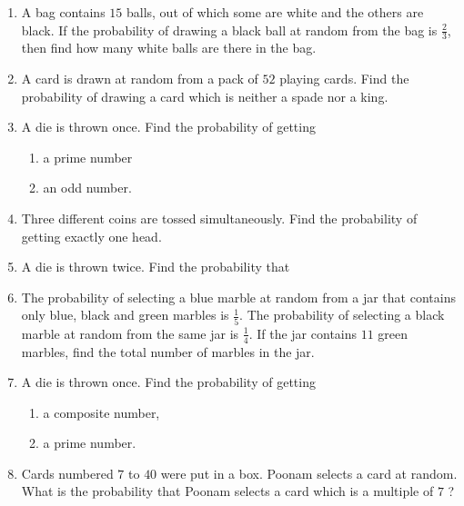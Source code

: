 \begin{enumerate}
\item A bag contains $15$ balls, out of which some are white and the others are black. If the probability of drawing a black ball at random from the bag is $\frac{2}{3}$, then find how many white balls are there in the bag.

\item A card is drawn at random from a pack of $52$ playing cards. Find the probability of drawing a card which is neither a spade nor a king.

\item A die is thrown once. Find the probability of getting
\begin{enumerate}
    \item a prime number
    \item an odd number. 
\end{enumerate}

\item Three different coins are tossed simultaneously. Find the probability of getting exactly one head.

\item A die is thrown twice. Find the probability that
\begin{enumerate}
\end{enumerate}

\item The probability of selecting a blue marble at random from a jar that contains only blue, black and green marbles is $\frac{1}{5}$. The probability of selecting a black marble at random from the same jar is $\frac{1}{4}$. If the jar contains $11$ green marbles, find the total number of marbles in the jar.

\item A die is thrown once. Find the probability of getting
\begin{enumerate}
\item a composite number,
\item a prime number.
\end{enumerate}

\item Cards numbered $7$ to $40$ were put in a box. Poonam selects a card at
random. What is the probability that Poonam selects a card which is a
multiple of $7$ ?


\end{enumerate}
